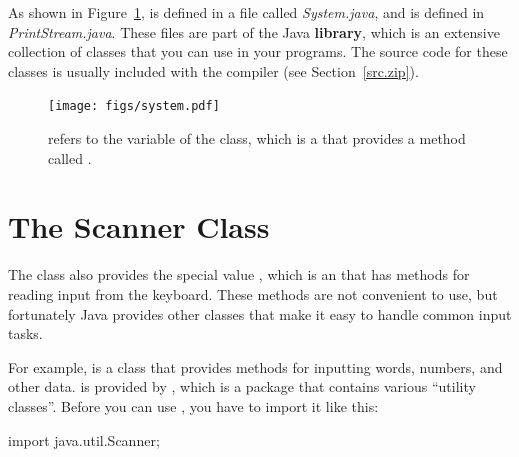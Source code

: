 
As shown in Figure~\ref{fig.system},  is defined in a file called {\it System.java}, and  is defined in {\it PrintStream.java}.
These files are part of the Java {\bf library}, which is an extensive collection of classes that you can use in your programs.
The source code for these classes is usually included with the compiler (see Section~\ref{src.zip}).

\begin{figure}[!ht]
\begin{center}
\texttt{[image: figs/system.pdf]}
\caption{ refers to the  variable of the  class, which is a  that provides a method called .}
\label{fig.system}
\end{center}
\end{figure}


\section{The Scanner Class}
\label{scanner}

%


The  class also provides the special value , which is an  that has methods for reading input from the keyboard.
These methods are not convenient to use, but fortunately Java provides other classes that make it easy to handle common input tasks.


For example,  is a class that provides methods for inputting words, numbers, and other data.
 is provided by , which is a package that contains various ``utility classes''.
Before you can use , you have to import it like this:

\begin{code}
import java.util.Scanner;
\end{code}

